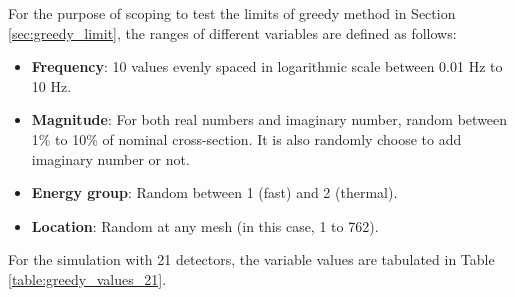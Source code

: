 \label{ch:appendixC}

For the purpose of scoping to test the limits of greedy method in Section \ref{sec:greedy_limit}, the ranges of different variables are defined as follows:
\begin{itemize}
    \item \textbf{Frequency}: 10 values evenly spaced in logarithmic scale between 0.01 Hz to 10 Hz. 
    \item \textbf{Magnitude}: For both real numbers and imaginary number, random between 1\% to 10\% of nominal cross-section. It is also randomly choose to add imaginary number or not.
    \item \textbf{Energy group}: Random between 1 (fast) and 2 (thermal).
    \item \textbf{Location}: Random at any mesh (in this case, 1 to 762).
\end{itemize}

For the simulation with 21 detectors, the variable values are tabulated in Table \ref{table:greedy_values_21}.

